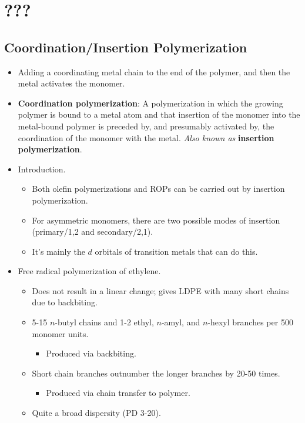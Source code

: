 \documentclass[../notes.tex]{subfiles}
\begin{document}
\chapter{???}
\section{Coordination/Insertion Polymerization}
\begin{itemize}
    \item {}Adding a coordinating metal chain to the end of the polymer, and then the metal activates the monomer.
    \item \textbf{Coordination polymerization}: A polymerization in which the growing polymer is bound to a metal atom and that insertion of the monomer into the metal-bound polymer is preceded by, and presumably activated by, the coordination of the monomer with the metal. \emph{Also known as} \textbf{insertion polymerization}.
    \item Introduction.
    \begin{itemize}
        \item Both olefin polymerizations and ROPs can be carried out by insertion polymerization.
        \item For asymmetric monomers, there are two possible modes of insertion (primary/1,2 and secondary/2,1).
        \item It's mainly the $d$ orbitals of transition metals that can do this.
    \end{itemize}
    \item Free radical polymerization of ethylene.
    \begin{itemize}
        \item Does not result in a linear change; gives LDPE with many short chains due to backbiting.
        \item 5-15 $n$-butyl chains and 1-2 ethyl, $n$-amyl, and $n$-hexyl branches per 500 monomer units.
        \begin{itemize}
            \item Produced via backbiting.
        \end{itemize}
        \item Short chain branches outnumber the longer branches by 20-50 times.
        \begin{itemize}
            \item Produced via chain transfer to polymer.
        \end{itemize}
        \item Quite a broad dispersity (PD 3-20).

\end{itemize}
\end{itemize}
\end{document}
